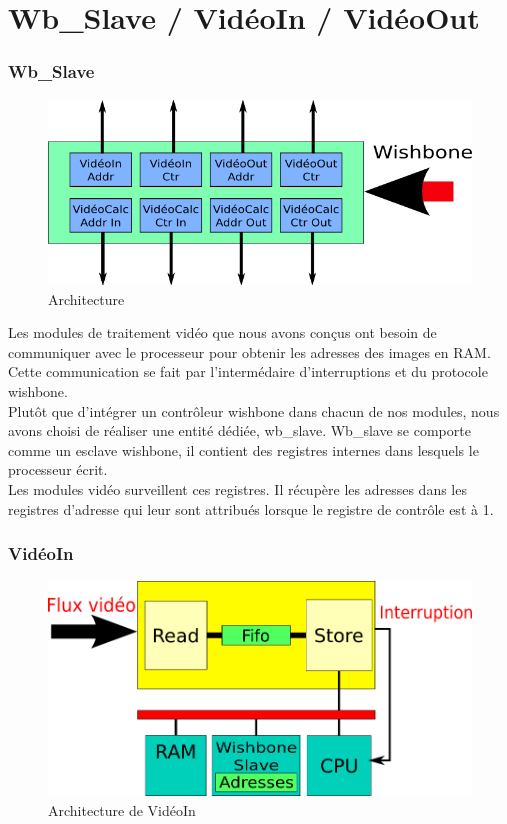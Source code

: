 \documentclass[a4paper,12pt]{report}
\begin{document}
{{    \part{Wb\_Slave / VidéoIn / VidéoOut}
    \section{Wb\_Slave}
\begin{figure}[!h]
	\centering
	\includegraphics[scale = 0.5]{wb_slave.png}
	\caption{Architecture}
\end{figure}

Les modules de traitement vidéo que nous avons conçus ont besoin de communiquer avec le processeur pour obtenir les adresses des images en RAM. 
Cette communication se fait par l'intermédaire d'interruptions et du protocole wishbone.\\
Plutôt que d'intégrer un contrôleur wishbone dans chacun de nos modules, 
nous avons choisi de réaliser une entité dédiée, wb\_slave.
Wb\_slave se comporte comme un esclave wishbone, il contient des registres internes dans lesquels le processeur écrit. \\
Les modules vidéo surveillent ces registres. Il récupère les adresses dans les registres d'adresse qui leur sont attribués lorsque le registre de contrôle est à 1.



    \section{VidéoIn}

\begin{figure}[!h]
	\centering
	\includegraphics[scale = 0.5]{video_in.png}
	\caption{Architecture de VidéoIn}
\end{figure}

}}
\end{document}
